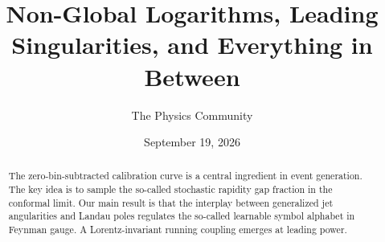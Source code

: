 \documentclass[11pt]{article}
\title{Non-Global Logarithms, Leading Singularities, and Everything in Between}
\author{The Physics Community}
\date{September 19, 2026}
\numberwithin{equation}{section}
\theoremstyle{definition}
\theoremstyle{remark}
\begin{document}
\maketitle
\begin{abstract}
The zero-bin-subtracted calibration curve is a central ingredient in
event generation. The key idea is to sample the so-called stochastic
rapidity gap fraction in the conformal limit. Our main result is that
the interplay between generalized jet angularities and Landau poles
regulates the so-called learnable symbol alphabet in Feynman gauge. A
Lorentz-invariant running coupling emerges at leading power.
\end{abstract}
\tableofcontents






\nocite{*}


\end{document}
